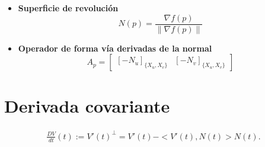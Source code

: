 \documentclass[8pt]{article}
\begin{document}
\begin{multicols}{3}
\begin{itemize}
  \item \textbf{Superficie de revolución} 
  \[
  N(p)=\frac{\nabla f(p)}{\|\nabla f(p)\|}
  \]

  \item \textbf{Operador de forma vía derivadas de la normal} 
  \[
  A_p =
  \begin{bmatrix}
    \left[ -N_u \right]_{\{X_u, X_v\}} &
    \left[ -N_v \right]_{\{X_u, X_v\}}
  \end{bmatrix}
  \]
\end{itemize}
\section*{Derivada covariante}
\begin{align*}
  \frac{DV}{dt}(t):=V'(t)^{\perp}=V'(t)-<V'(t),N(t)>N(t).
\end{align*}
\end{multicols}
\end{document}
